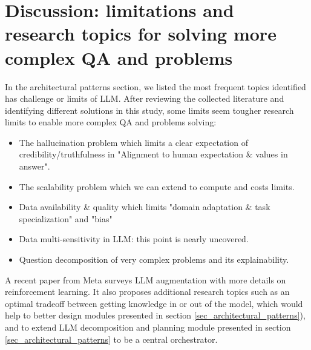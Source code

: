 \documentclass[acmsmall]{acmart}
\begin{document}
\section{Discussion: limitations and research topics for solving more complex QA and problems}\label{sec_limits_and_research}
In the architectural patterns section, we listed the most frequent topics identified has challenge or limits of LLM. After reviewing the collected literature and identifying different solutions in this study, some limits seem tougher research limits to enable more complex QA and problems solving:
\begin{itemize}
    \item The hallucination problem which limits a clear expectation of credibility/truthfulness in "Alignment to human expectation \& values in answer".
    \item The scalability problem which we can extend to compute and costs limits.
    \item Data availability \& quality which limits "domain adaptation \& task specialization" and "bias" 
    \item Data multi-sensitivity in LLM: this point is nearly uncovered.
    \item Question decomposition of very complex problems and its explainability.
\end{itemize}
A recent paper from Meta\citep{mialonAugmentedLanguageModels2023} surveys LLM augmentation with more details on reinforcement learning. It also proposes additional research topics such as an optimal tradeoff between getting knowledge in or out of the model, which would help to better design modules presented in section \ref{sec_architectural_patterns}), and to extend LLM decomposition and planning module presented in section \ref{sec_architectural_patterns} to be a central orchestrator.
\end{document}
